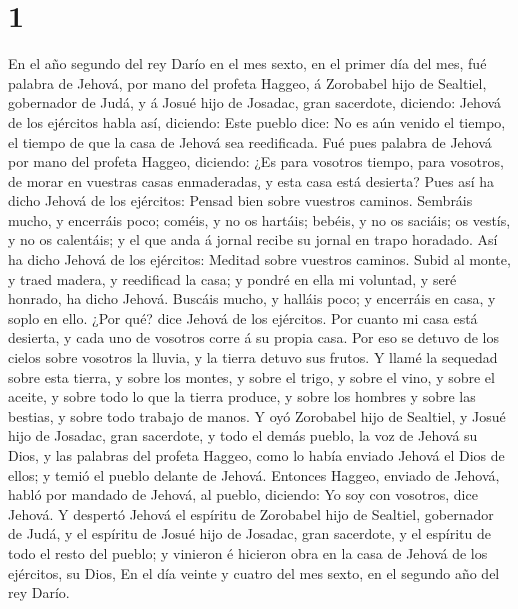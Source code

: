 \hypertarget{section}{%
\section{1}\label{section}}

 En el año segundo del rey Darío en el mes sexto, en el
primer día del mes, fué palabra de Jehová, por mano del profeta Haggeo,
á Zorobabel hijo de Sealtiel, gobernador de Judá, y á Josué hijo de
Josadac, gran sacerdote, diciendo:  Jehová de los ejércitos
habla así, diciendo: Este pueblo dice: No es aún venido el tiempo, el
tiempo de que la casa de Jehová sea reedificada.  Fué pues
palabra de Jehová por mano del profeta Haggeo, diciendo: 
¿Es para vosotros tiempo, para vosotros, de morar en vuestras casas
enmaderadas, y esta casa está desierta?  Pues así ha dicho
Jehová de los ejércitos: Pensad bien sobre vuestros caminos.
 Sembráis mucho, y encerráis poco; coméis, y no os hartáis;
bebéis, y no os saciáis; os vestís, y no os calentáis; y el que anda á
jornal recibe su jornal en trapo horadado.  Así ha dicho
Jehová de los ejércitos: Meditad sobre vuestros caminos. 
Subid al monte, y traed madera, y reedificad la casa; y pondré en ella
mi voluntad, y seré honrado, ha dicho Jehová.  Buscáis
mucho, y halláis poco; y encerráis en casa, y soplo en ello. ¿Por qué?
dice Jehová de los ejércitos. Por cuanto mi casa está desierta, y cada
uno de vosotros corre á su propia casa.  Por eso se detuvo
de los cielos sobre vosotros la lluvia, y la tierra detuvo sus frutos.
 Y llamé la sequedad sobre esta tierra, y sobre los montes,
y sobre el trigo, y sobre el vino, y sobre el aceite, y sobre todo lo
que la tierra produce, y sobre los hombres y sobre las bestias, y sobre
todo trabajo de manos.  Y oyó Zorobabel hijo de Sealtiel, y
Josué hijo de Josadac, gran sacerdote, y todo el demás pueblo, la voz de
Jehová su Dios, y las palabras del profeta Haggeo, como lo había enviado
Jehová el Dios de ellos; y temió el pueblo delante de Jehová.
 Entonces Haggeo, enviado de Jehová, habló por mandado de
Jehová, al pueblo, diciendo: Yo soy con vosotros, dice Jehová.
 Y despertó Jehová el espíritu de Zorobabel hijo de
Sealtiel, gobernador de Judá, y el espíritu de Josué hijo de Josadac,
gran sacerdote, y el espíritu de todo el resto del pueblo; y vinieron é
hicieron obra en la casa de Jehová de los ejércitos, su Dios,
 En el día veinte y cuatro del mes sexto, en el segundo año
del rey Darío.

